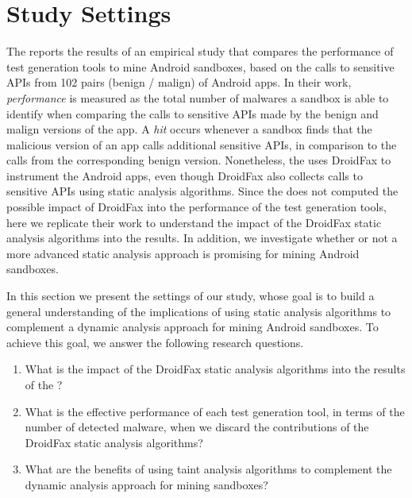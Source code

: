 \section{Study Settings}


The \blls reports the results of an empirical study that compares the performance of test generation tools to mine Android
sandboxes, based on the calls to sensitive APIs from 102 pairs (benign / malign) of Android apps. In their work, \emph{performance} is
measured as the total number of malwares a sandbox is able to identify when comparing the calls to sensitive APIs made by
the benign and malign versions of the app. A \emph{hit} occurs whenever a sandbox finds that the malicious version of an app calls
additional sensitive APIs, in comparison to the calls from the corresponding benign version.
Nonetheless, the \blls uses DroidFax to instrument the Android apps, even though DroidFax also
collects calls to sensitive APIs using static analysis algorithms. Since the \blls does not
computed the possible impact of DroidFax into the performance of the test generation tools,
here we replicate their work to understand the impact of the DroidFax static analysis algorithms into the \blls results. In addition,
we investigate whether or not a more advanced static analysis approach is promising for
mining Android sandboxes.

In this section
we present the settings of our study, whose goal is to build a general understanding of the implications of using static analysis algorithms
to complement a dynamic analysis approach
for mining Android sandboxes. %
To achieve this goal, we answer the following research questions.

\begin{enumerate}[(RQ1)]
 
 \item What is the impact of the DroidFax static analysis algorithms into the results of the \blls?
  
 \item What is the effective performance of each test generation tool, in terms of the number of detected malware, when we
   discard the contributions of the DroidFax static analysis algorithms?

 \item What are the benefits of using taint
 analysis algorithms to complement the dynamic analysis approach for mining sandboxes?
\end{enumerate}

